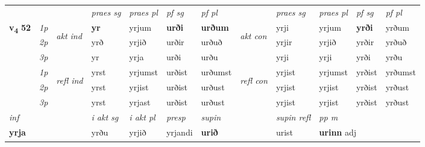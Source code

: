 \begin{longtable}[l]{X>{\footnotesize\itshape}llXXXXlXXXX}
 & &   & \textit{praes sg}  & \textit{praes pl}    & \textit{ pf sg} & \textit{pf pl} & & \textit{praes sg}  & \textit{praes pl}    & \textit{pf sg} & \textit{pf pl }  \\ \cmidrule{4-7} \cmidrule{9-12}
 \multirow{2}{*}{{{\textbf{v{\textsubscript{4}}} \Large{\textbf{52}}}}}  & 1p & \multirow{3}{*}{\begin{turn}{90}\textit{akt ind}\end{turn}} & \textbf{yr} & yrjum & \textbf{urði} & \textbf{urðum} & \multirow{3}{*}{\begin{turn}{90}\textit{akt con}\end{turn}} &yrji & yrjum & \textbf{yrði} & yrðum\\*
 & 2p &  &  yrð  & yrjið & urðir & urðuð & & yrjir & yrjið & yrðir & yrðuð \\*
 & 3p &  & yr & yrja & urði & urðu & & yrji & yrji& yrði & yrðu \\*
\cmidrule{4-7} \cmidrule{9-12}
 & 1p & \multirow{3}{*}{\begin{turn}{90}\textit{refl ind}\end{turn}}  & yrst & yrjumst & urðist & urðumst & \multirow{3}{*}{\begin{turn}{90}\textit{refl con}\end{turn}}  &yrjist & yrjumst & yrðist & yrðumst \\*
 & 2p &  & yrst & yrjist & urðist & urðust & &yrjist & yrjist & yrðist & yrðust \\*
 & 3p  & & yrst & yrjast & urðist & urðust & & yrjist & yrjist& yrðist & yrðust \\*
\cmidrule{4-7} \cmidrule{9-12}

   {\textit{inf}} & &  & \textit{i akt sg} & \textit{i akt pl}   & \textit{presp} & \textit{supin} && \textit{supin refl} & \textit{pp m} \\*
  {\textbf{yrja}} & && yrðu  & yrjið   & yrjandi &  \textbf{urið} && urist & \multicolumn{2}{l}{\textbf{urinn} adj\textbf{\textsubscript{}}} \\*


\end{longtable}
